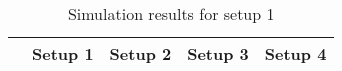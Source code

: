 \begin{table}[ht]
\centering
\begin{tabular}{rrrrr}
  \hline
 & Setup 1 & Setup 2 & Setup 3 & Setup 4 \\ 
  \hline

   \hline
\end{tabular}
\caption{Simulation results for setup 1} 
\end{table}